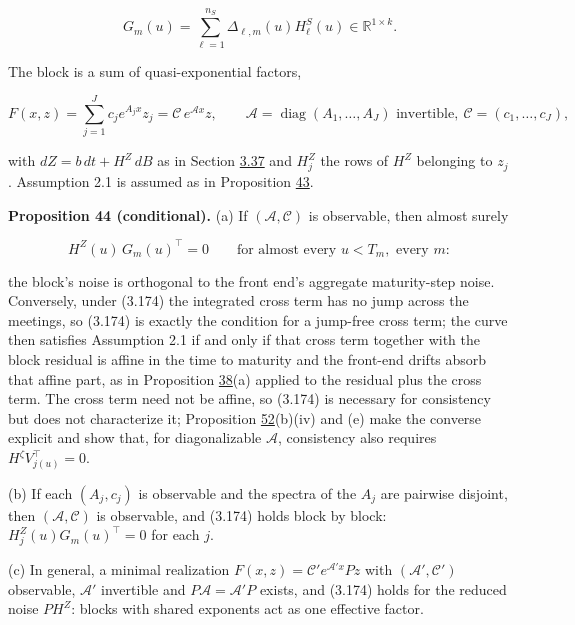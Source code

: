 \documentclass[11pt]{article}
\begin{document}
\begin{equation*}
G_m(u)=\sum_{\ell=1}^{n_S}\Delta_{\ell,m}(u)H^S_\ell(u)\in\mathbb R^{1\times k}. \tag{3.172}\label{eq:3.172}
\end{equation*}

The block is a sum of quasi-exponential factors,

\begin{equation*}
F(x,z)=\sum_{j=1}^Jc_je^{A_jx}z_j=\mathcal C\,e^{\mathcal Ax}z,\qquad \mathcal A=\operatorname{diag}(A_1,\dots,A_J)\text{ invertible},\ \mathcal C=(c_1,\dots,c_J), \tag{3.173}\label{eq:3.173}
\end{equation*}

with \(dZ=b\,dt+H^Z\,dB\) as in Section \hyperref[sec:3.37]{3.37} and \(H^Z_j\) the rows of \(H^Z\) belonging to \(z_j\). Assumption 2.1 is assumed as in Proposition \hyperref[res:Proposition-43]{43}.

\label{res:Proposition-44}
\textbf{Proposition 44 (conditional).} (a) If \((\mathcal A,\mathcal C)\) is observable, then almost surely

\begin{equation*}
H^Z(u)\,G_m(u)^\top=0\qquad\text{for almost every }u<T_m,\text{ every }m: \tag{3.174}\label{eq:3.174}
\end{equation*}

the block's noise is orthogonal to the front end's aggregate maturity-step noise. Conversely, under (3.174) the integrated cross term has no jump across the meetings, so (3.174) is exactly the condition for a jump-free cross term; the curve then satisfies Assumption 2.1 if and only if that cross term together with the block residual is affine in the time to maturity and the front-end drifts absorb that affine part, as in Proposition \hyperref[res:Proposition-38]{38}(a) applied to the residual plus the cross term. The cross term need not be affine, so (3.174) is necessary for consistency but does not characterize it; Proposition \hyperref[res:Proposition-52]{52}(b)(iv) and (e) make the converse explicit and show that, for diagonalizable \(\mathcal A\), consistency also requires \(H^\zeta V_{j(u)}^\top=0\).

(b) If each \((A_j,c_j)\) is observable and the spectra of the \(A_j\) are pairwise disjoint, then \((\mathcal A,\mathcal C)\) is observable, and (3.174) holds block by block: \(H^Z_j(u)G_m(u)^\top=0\) for each \(j\).

(c) In general, a minimal realization \(F(x,z)=\mathcal C'e^{\mathcal A'x}Pz\) with \((\mathcal A',\mathcal C')\) observable, \(\mathcal A'\) invertible and \(P\mathcal A=\mathcal A'P\) exists, and (3.174) holds for the reduced noise \(PH^Z\): blocks with shared exponents act as one effective factor.
\end{document}

